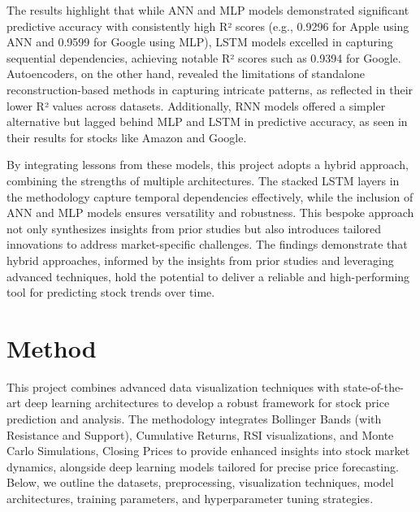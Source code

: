 \documentclass[conference]{IEEEtran}
\begin{document}
The results highlight that while ANN and MLP models demonstrated significant predictive accuracy with consistently high R² scores (e.g., 0.9296 for Apple using ANN and 0.9599 for Google using MLP), LSTM models excelled in capturing sequential dependencies, achieving notable R² scores such as 0.9394 for Google. Autoencoders, on the other hand, revealed the limitations of standalone reconstruction-based methods in capturing intricate patterns, as reflected in their lower R² values across datasets. Additionally, RNN models offered a simpler alternative but lagged behind MLP and LSTM in predictive accuracy, as seen in their results for stocks like Amazon and Google.

By integrating lessons from these models, this project adopts a hybrid approach, combining the strengths of multiple architectures. The stacked LSTM layers in the methodology capture temporal dependencies effectively, while the inclusion of ANN and MLP models ensures versatility and robustness. This bespoke approach not only synthesizes insights from prior studies but also introduces tailored innovations to address market-specific challenges. The findings demonstrate that hybrid approaches, informed by the insights from prior studies and leveraging advanced techniques, hold the potential to deliver a reliable and high-performing tool for predicting stock trends over time.


\section{Method}

This project combines advanced data visualization techniques with state-of-the-art deep learning architectures to develop a robust framework for stock price prediction and analysis. The methodology integrates Bollinger Bands (with Resistance and Support), Cumulative Returns, RSI visualizations, and Monte Carlo Simulations, Closing Prices to provide enhanced insights into stock market dynamics, alongside deep learning models tailored for precise price forecasting. Below, we outline the datasets, preprocessing, visualization techniques, model architectures, training parameters, and hyperparameter tuning strategies.
\end{document}
